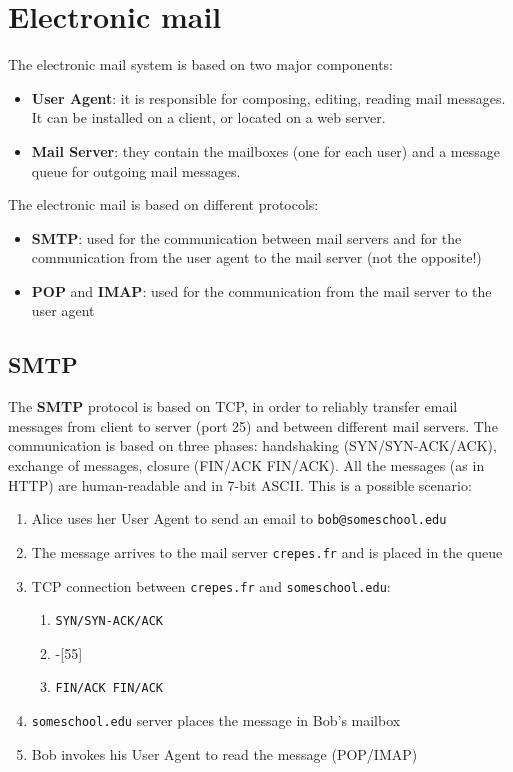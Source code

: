\section{Electronic mail}
The electronic mail system is based on two major components:
\begin{itemize}
    \item \textbf{User Agent}: it is responsible for composing, editing, reading mail messages. It can be installed on a client, or located on a web server.
    \item \textbf{Mail Server}: they contain the mailboxes (one for each user) and a message queue for outgoing mail messages.
\end{itemize}

\noindent The electronic mail is based on different protocols:
\begin{itemize}
    \item \textbf{SMTP}: used for the communication between mail servers and for the communication from the user agent to the mail server (not the opposite!)
    \item \textbf{POP} and \textbf{IMAP}: used for the communication from the mail server to the user agent
\end{itemize}

\subsection{SMTP}
The \textbf{SMTP} protocol is based on TCP, in order to reliably transfer email messages from client to server (port 25) and between different mail servers. The communication is based on three phases: handshaking (SYN/SYN-ACK/ACK), exchange of messages, closure (FIN/ACK FIN/ACK). All the messages (as in HTTP) are human-readable and in 7-bit ASCII. This is a possible scenario:
\begin{enumerate}
    \item Alice uses her User Agent to send an email to \texttt{bob@someschool.edu}
    \item The message arrives to the mail server \texttt{crepes.fr} and is placed in the queue
    \item TCP connection between \texttt{crepes.fr} and \texttt{someschool.edu}:
    \begin{enumerate}
        \item \texttt{SYN/SYN-ACK/ACK}
        \item -[55]
        \item \texttt{FIN/ACK FIN/ACK}
    \end{enumerate}
    \item \texttt{someschool.edu} server places the message in Bob's mailbox
    \item Bob invokes his User Agent to read the message (POP/IMAP)
\end{enumerate}

